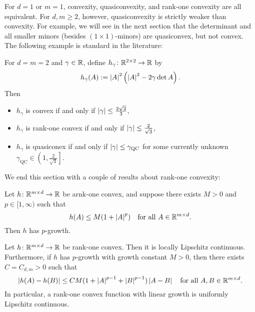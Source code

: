 For $d=1$ or $m=1$, convexity, quasiconvexity, and rank-one convexity are all equivalent. For $d,m \geq 2$, however, quasiconvexity is strictly weaker than convexity. For example, we will see in the next section that the determinant and all smaller minors (besides $(1 \times 1)$-minors) are quasiconvex, but not convex. The following example is standard in the literature:
\begin{example}
    For $d=m=2$ and $\gamma \in \mathbb{R}$, define $h_\gamma \colon \mathbb{R}^{2 \times 2} \to \mathbb{R}$ by 
    \begin{equation}
        h_\gamma(A) := \left\lvert {A} \right\rvert^2 \left( { \left\lvert {A} \right\rvert^2 - 2\gamma \det{A} } \right).
    \end{equation}
    Then 
    \begin{itemize}
        \item $h_\gamma$ is convex if and only if $\left\lvert {\gamma} \right\rvert \leq \frac{2\sqrt{2}}{3}$,
        \item $h_\gamma$ is rank-one convex if and only if $\left\lvert {\gamma} \right\rvert \leq \frac{2}{\sqrt{3}}$,
        \item $h_\gamma$ is quasiconex if and only if $\left\lvert {\gamma} \right\rvert \leq \gamma_{\rm QC}$ for some currently unknown $\gamma_\mathrm{QC} \in \left(1,\frac{2}{\sqrt{3}}\right]$.
    \end{itemize}
\end{example}

We end this section with a couple of results about rank-one convexity:
\begin{lemma}
    Let $h \colon \mathbb{R}^{m \times d} \to \mathbb{R}$ be arnk-one convex, and suppose there exists $M > 0$ and $p \in [1,\infty)$ such that 
    \begin{equation}
        h(A) \leq M(1 + \left\lvert {A} \right\rvert^p) \quad \text{for all } A \in \mathbb{R}^{m \times d}.
    \end{equation}
    Then $h$ has $p$-growth.
\end{lemma}
\begin{lemma}
    Let $h \colon \mathbb{R}^{m \times d} \to \mathbb{R}$ be rank-one convex. Then it is locally Lipschitz continuous. Furthermore, if $h$ has $p$-growth with growth constant $M > 0$, then there exists $C = C_{d,m} > 0$ such that 
    \begin{equation}
        \left\lvert {h(A) - h(B)} \right\rvert \leq CM(1 + \left\lvert {A} \right\rvert^{p-1} + \left\lvert {B} \right\rvert^{p-1})\left\lvert {A-B} \right\rvert \quad \text{for all } A,B \in \mathbb{R}^{m \times d}.
    \end{equation}
    In particular, a rank-one convex function with linear growth is uniformly Lipschitz continuous.
\end{lemma}

